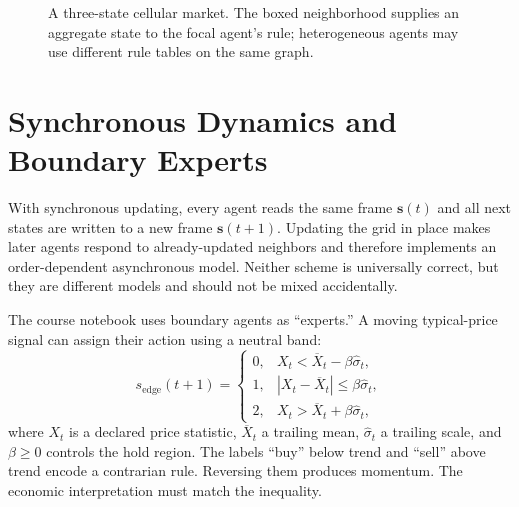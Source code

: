\documentclass[11pt]{article}
\begin{document}
\begin{figure}[ht]
  \centering
  \caption{A three-state cellular market. The boxed neighborhood supplies an aggregate state to the focal agent's rule; heterogeneous agents may use different rule tables on the same graph.}
  \label{fig:wolfram-grid}
\end{figure}

\section{Synchronous Dynamics and Boundary Experts}

With synchronous updating, every agent reads the same frame $\mathbf s(t)$ and all next states are written to a new frame $\mathbf s(t+1)$. Updating the grid in place makes later agents respond to already-updated neighbors and therefore implements an order-dependent asynchronous model. Neither scheme is universally correct, but they are different models and should not be mixed accidentally.

The course notebook uses boundary agents as ``experts.'' A moving typical-price signal can assign their action using a neutral band:
\begin{equation}
  \label{eq:technical-boundary}
  s_{\mathrm{edge}}(t+1)=
  \begin{cases}
    0, & X_t<\overline X_t-\beta\widehat\sigma_t,\\
    1, & |X_t-\overline X_t|\leq\beta\widehat\sigma_t,\\
    2, & X_t>\overline X_t+\beta\widehat\sigma_t,
  \end{cases}
\end{equation}
where $X_t$ is a declared price statistic, $\overline X_t$ a trailing mean, $\widehat\sigma_t$ a trailing scale, and $\beta\geq0$ controls the hold region. The labels ``buy'' below trend and ``sell'' above trend encode a contrarian rule. Reversing them produces momentum. The economic interpretation must match the inequality.
\end{document}
